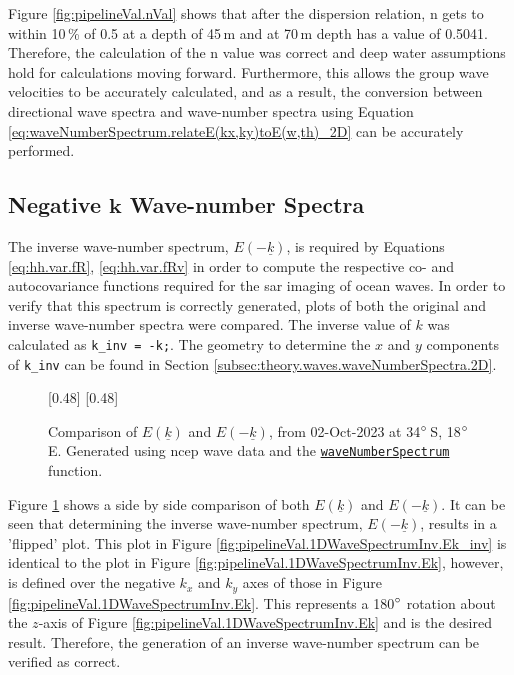 Figure \ref{fig:pipelineVal.nVal} shows that after the dispersion relation, n gets to within 10\,\% of 0.5 at a depth of 45\,m and at 70\,m depth has a value of 0.5041. Therefore, the calculation of the n value was correct and deep water assumptions hold for calculations moving forward. Furthermore, this allows the group wave velocities to be accurately calculated, and as a result, the conversion between directional wave spectra and wave-number spectra using Equation \ref{eq:waveNumberSpectrum.relateE(kx,ky)toE(w,th)_2D} can be accurately performed.

\subsection{Negative $\mathbf{k}$ Wave-number Spectra} \label{subsec:pipelineVal.waveSpecta.invK}

The inverse wave-number spectrum, $E(-\underline{k})$, is required by Equations \ref{eq:hh.var.fR}, \ref{eq:hh.var.fRv} in order to compute the respective co- and autocovariance functions required for the \acs{sar} imaging of ocean waves. In order to verify that this spectrum is correctly generated, plots of both the original and inverse wave-number spectra were compared. The inverse value of $k$ was calculated as \lstinline{k_inv = -k;}. The geometry to determine the $x$ and $y$ components of \lstinline{k_inv} can be found in Section \ref{subsec:theory.waves.waveNumberSpectra.2D}.

\begin{figure}[H]
    \centering
    [0.48\linewidth]{
        \resizebox{\linewidth}{!}{}
    }
    [0.48\linewidth]{
        \resizebox{\linewidth}{!}{}
    }
    \caption{Comparison of $E(\underline{k})$ and $E(-\underline{k})$, from 02-Oct-2023 at 34$\degree$\,S, 18$\degree$\,E. Generated using \acs{ncep} wave data and the \href{https://github.com/JNSRYA006/sar-parameter-extraction-pipeline/blob/main/functions/waveSpectra/waveNumberSpectrum.m}{\lstinline{waveNumberSpectrum}} function.}
    \label{fig:pipelineVal.1DWaveSpectrumInv}
\end{figure}

Figure \ref{fig:pipelineVal.1DWaveSpectrumInv} shows a side by side comparison of both $E(\underline{k})$ and $E(-\underline{k})$. It can be seen that determining the inverse wave-number spectrum, $E(-\underline{k})$, results in a 'flipped' plot. This plot in Figure \ref{fig:pipelineVal.1DWaveSpectrumInv.Ek_inv} is identical to the plot in Figure \ref{fig:pipelineVal.1DWaveSpectrumInv.Ek}, however, is defined over the negative $k_x$ and $k_y$ axes of those in Figure \ref{fig:pipelineVal.1DWaveSpectrumInv.Ek}. This represents a 180$\degree$ rotation about the $z$-axis of Figure \ref{fig:pipelineVal.1DWaveSpectrumInv.Ek} and is the desired result. Therefore, the generation of an inverse wave-number spectrum can be verified as correct.


